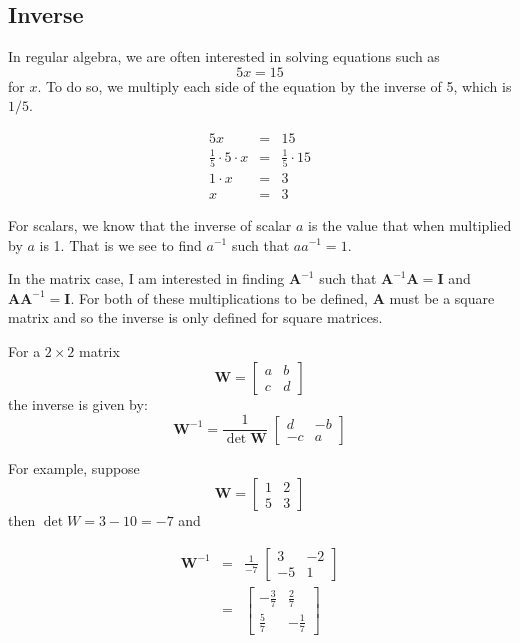 \documentclass[]{book}
\theoremstyle{definition}
\theoremstyle{definition}
\theoremstyle{remark}
\begin{document}
\subsection{Inverse}\label{inverse}

In regular algebra, we are often interested in solving equations such as
\[ 5x=15 \] for \(x\). To do so, we multiply each side of the equation
by the inverse of 5, which is \(1/5\).

\begin{eqnarray*}
5x & = & 15\\
\frac{1}{5}\cdot5\cdot x & = & \frac{1}{5}\cdot15\\
1\cdot x & = & 3\\
x & = & 3
\end{eqnarray*}

For scalars, we know that the inverse of scalar \(a\) is the value that
when multiplied by \(a\) is 1. That is we see to find \(a^{-1}\) such
that \(aa^{-1}=1\).

In the matrix case, I am interested in finding \(\boldsymbol{A}^{-1}\)
such that \(\boldsymbol{A}^{-1}\boldsymbol{A}=\boldsymbol{I}\) and
\(\boldsymbol{A}\boldsymbol{A}^{-1}=\boldsymbol{I}\). For both of these
multiplications to be defined, \(\boldsymbol{A}\) must be a square
matrix and so the inverse is only defined for square matrices.

For a \(2\times2\) matrix \[
\boldsymbol{W}=\left[\begin{array}{cc}
a & b\\
c & d
\end{array}\right]
\] the inverse is given by: \[
\boldsymbol{W}^{-1}=\frac{1}{\det\boldsymbol{W}}\;\left[\begin{array}{cc}
d & -b\\
-c & a
\end{array}\right]
\]

For example, suppose \[
\boldsymbol{W}=\left[\begin{array}{cc}
1 & 2\\
5 & 3
\end{array}\right]
\] then \(\det W=3-10=-7\) and

\begin{eqnarray*}
\boldsymbol{W}^{-1} & = & \frac{1}{-7}\;\left[\begin{array}{cc}
3 & -2\\
-5 & 1
\end{array}\right]\\
 & = & \left[\begin{array}{cc}
-\frac{3}{7} & \frac{2}{7}\\
\frac{5}{7} & -\frac{1}{7}
\end{array}\right]
\end{eqnarray*}
\end{document}

